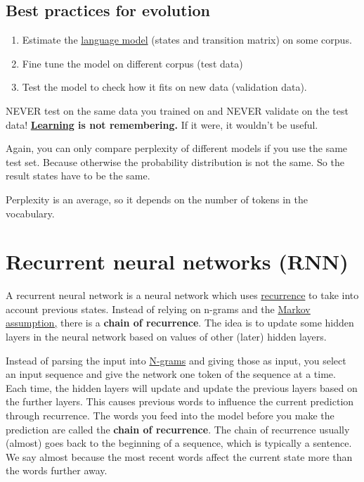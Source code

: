 \documentclass[
  11pt,
  british,
]{article}
\providecommand{\tightlist}{%
  \setlength{\itemsep}{0pt}\setlength{\parskip}{0pt}}
\begin{document}
\hypertarget{best-practices-for-evolution}{%
\subsection{Best practices for
evolution}\label{best-practices-for-evolution}}

\begin{enumerate}
\def\labelenumi{\arabic{enumi}.}
\tightlist
\item
  Estimate the \href{Language\%20Modeling.md}{language model} (states
  and transition matrix) on some corpus.
\item
  Fine tune the model on different corpus (test data)
\item
  Test the model to check how it fits on new data (validation data).
\end{enumerate}

NEVER test on the same data you trained on and NEVER validate on the
test data! \textbf{\href{../Other/Learning.md}{Learning} is not
remembering.} If it were, it wouldn't be useful.

Again, you can only compare perplexity of different models if you use
the same test set. Because otherwise the probability distribution is not
the same. So the result states have to be the same.

Perplexity is an average, so it depends on the number of tokens in the
vocabulary.

\hypertarget{recurrent-neural-networks-rnn}{%
\section{Recurrent neural networks
(RNN)}\label{recurrent-neural-networks-rnn}}

A recurrent neural network is a neural network which uses
\href{Recurrence.md}{recurrence} to take into account previous states.
Instead of relying on n-grams and the
\href{Prediction/Markov\%20assumption.md}{Markov assumption,} there is a
\textbf{chain of recurrence}. The idea is to update some hidden layers
in the neural network based on values of other (later) hidden layers.

Instead of parsing the input into \href{Languages/N-grams.md}{N-grams}
and giving those as input, you select an input sequence and give the
network one token of the sequence at a time. Each time, the hidden
layers will update and update the previous layers based on the further
layers. This causes previous words to influence the current prediction
through recurrence. The words you feed into the model before you make
the prediction are called the \textbf{chain of recurrence}. The chain of
recurrence usually (almost) goes back to the beginning of a sequence,
which is typically a sentence. We say almost because the most recent
words affect the current state more than the words further away.
\end{document}
